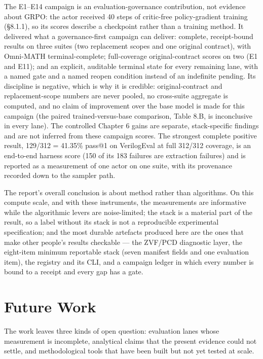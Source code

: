 \documentclass[12pt,a4paper]{report}
\begin{document}
The E1--E14 campaign is an evaluation-governance contribution, not
evidence about GRPO: the actor received 40 steps of critic-free
policy-gradient training (§8.1.1), so its scores describe a checkpoint
rather than a training method. It delivered what a governance-first
campaign can deliver: complete, receipt-bound results on three suites
(two replacement scopes and one original contract), with Omni-MATH
terminal-complete; full-coverage original-contract scores on two (E1 and
E11); and an explicit, auditable terminal state for every remaining
lane, with a named gate and a named reopen condition instead of an
indefinite pending. Its discipline is negative, which is why it is
credible: original-contract and replacement-scope numbers are never
pooled, no cross-suite aggregate is computed, and no claim of
improvement over the base model is made for this campaign (the paired
trained-versus-base comparison, Table 8.B, is inconclusive in every
lane). The controlled Chapter 6 gains are separate, stack-specific
findings and are not inferred from these campaign scores. The strongest
complete positive result, 129/312 = 41.35\% pass@1 on VerilogEval at
full 312/312 coverage, is an end-to-end harness score (150 of its 183
failures are extraction failures) and is reported as a measurement of
one actor on one suite, with its provenance recorded down to the sampler
path.

The report's overall conclusion is about method rather than algorithms.
On this compute scale, and with these instruments, the measurements are
informative while the algorithmic levers are noise-limited; the stack is
a material part of the result, so a label without its stack is not a
reproducible experimental specification; and the most durable artefacts
produced here are the ones that make other people's results checkable
--- the ZVF/PCD diagnostic layer, the eight-item minimum reportable
stack (seven manifest fields and one evaluation item), the registry and
its CLI, and a campaign ledger in which every number is bound to a
receipt and every gap has a gate.

\section{Future Work}\label{future-work}

The work leaves three kinds of open question: evaluation lanes whose
measurement is incomplete, analytical claims that the present evidence
could not settle, and methodological tools that have been built but not
yet tested at scale.
\end{document}
